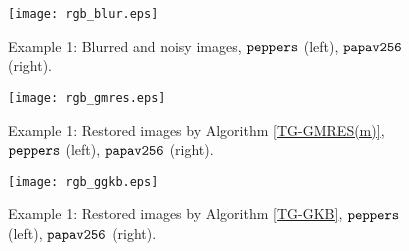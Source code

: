 \documentclass{siamltex}
\newcommand{\1}{\mathbb{1}}
\newcommand{\0}{\mathbb{0}}
\begin{document}
	\begin{figure}
		\begin{center}
			\texttt{[image: rgb\_blur.eps]}
			\caption{Example 1: Blurred and noisy images, $\tt peppers$ (left), $\tt papav256$ (right).}\label{fig2}
		\end{center}
	\end{figure}
	\begin{figure}
		\begin{center}
			\texttt{[image: rgb\_gmres.eps]}
			\caption{Example 1: Restored images by Algorithm \ref{TG-GMRES(m)}, $\tt peppers$ (left), $\tt papav256$ (right).}\label{fig3}
		\end{center}
	\end{figure}
	\begin{figure}
		\begin{center}
			\texttt{[image: rgb\_ggkb.eps]}
			\caption{Example 1: Restored images by Algorithm \ref{TG-GKB}, $\tt peppers$ (left), $\tt papav256$ (right).}\label{fig4}
		\end{center}
	\end{figure}
\end{document}

